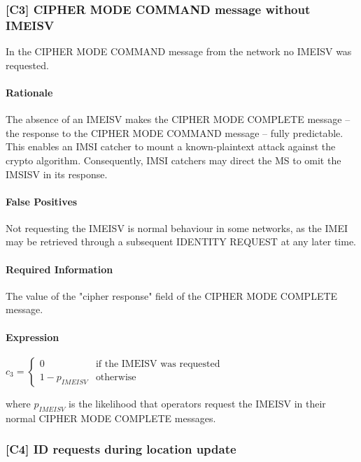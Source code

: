 \documentclass[a4paper,11pt,notitlepage,bigheadings,oneside]{scrartcl}
\begin{document}
\subsubsection{[C3] CIPHER MODE COMMAND message without IMEISV}

In the CIPHER MODE COMMAND message from the network no IMEISV was requested.

\paragraph{Rationale}

The absence of an IMEISV makes the CIPHER MODE COMPLETE message -- the response
to the CIPHER MODE COMMAND message -- fully predictable. This enables an IMSI
catcher to mount a known-plaintext attack against the crypto algorithm.
Consequently, IMSI catchers may direct the MS to omit the IMSISV in its
response.

\paragraph{False Positives}

Not requesting the IMEISV is normal behaviour in some networks, as the IMEI may
be retrieved through a subsequent IDENTITY REQUEST at any later time.

\paragraph{Required Information}

The value of the "cipher response" field of the CIPHER MODE COMPLETE message.

\paragraph{Expression}

$c_3 =
\begin{cases}
	0 		& \text{if the IMEISV was requested} \\
	1 - p_{IMEISV}	& \text{otherwise}
\end{cases}$

where $p_{IMEISV}$ is the likelihood that operators request the IMEISV in their
normal CIPHER MODE COMPLETE messages.


\subsubsection{[C4] ID requests during location update}
\end{document}
